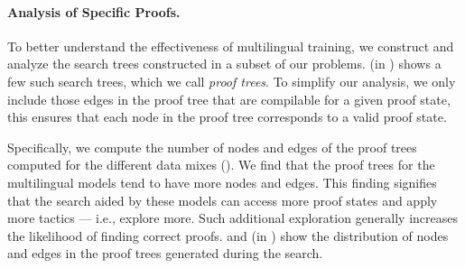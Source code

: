 \paragraph{Analysis of Specific Proofs.}\label{sec:quantitative-analysis} To better understand the effectiveness of multilingual training, we construct and analyze the search trees constructed in a subset of our problems.  (in ) shows a few such search trees, which we call \emph{proof trees}. To simplify our analysis, we only include those edges in the proof tree that are compilable for a given proof state, this ensures that each node in the proof tree corresponds to a valid proof state. 

Specifically, we compute the number of nodes and edges of the proof trees 
computed for the different data mixes (). 
We find that the proof trees for the multilingual models tend to 
have more nodes and edges. This finding signifies that the search aided by these models can access more proof states and apply more tactics --- i.e., explore more. Such additional exploration 
generally increases the likelihood of finding correct proofs. 
 and  (in ) show the distribution of nodes and edges in the proof trees generated during the search. 


